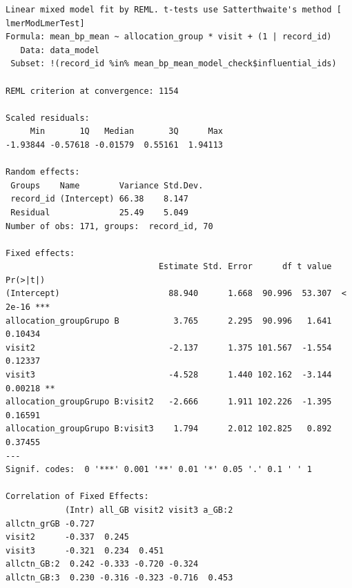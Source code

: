 \documentclass[
  letterpaper,
  DIV=11,
  numbers=noendperiod]{scrartcl}
\newenvironment{Shaded}{\begin{snugshade}}{\end{snugshade}}
\newcommand{\NormalTok}[1]{\textcolor[rgb]{0.00,0.23,0.31}{#1}}
\newcommand{\SpecialCharTok}[1]{\textcolor[rgb]{0.37,0.37,0.37}{#1}}
\begin{document}
\begin{verbatim}
Linear mixed model fit by REML. t-tests use Satterthwaite's method [
lmerModLmerTest]
Formula: mean_bp_mean ~ allocation_group * visit + (1 | record_id)
   Data: data_model
 Subset: !(record_id %in% mean_bp_mean_model_check$influential_ids)

REML criterion at convergence: 1154

Scaled residuals: 
     Min       1Q   Median       3Q      Max 
-1.93844 -0.57618 -0.01579  0.55161  1.94113 

Random effects:
 Groups    Name        Variance Std.Dev.
 record_id (Intercept) 66.38    8.147   
 Residual              25.49    5.049   
Number of obs: 171, groups:  record_id, 70

Fixed effects:
                               Estimate Std. Error      df t value Pr(>|t|)    
(Intercept)                      88.940      1.668  90.996  53.307  < 2e-16 ***
allocation_groupGrupo B           3.765      2.295  90.996   1.641  0.10434    
visit2                           -2.137      1.375 101.567  -1.554  0.12337    
visit3                           -4.528      1.440 102.162  -3.144  0.00218 ** 
allocation_groupGrupo B:visit2   -2.666      1.911 102.226  -1.395  0.16591    
allocation_groupGrupo B:visit3    1.794      2.012 102.825   0.892  0.37455    
---
Signif. codes:  0 '***' 0.001 '**' 0.01 '*' 0.05 '.' 0.1 ' ' 1

Correlation of Fixed Effects:
            (Intr) all_GB visit2 visit3 a_GB:2
allctn_grGB -0.727                            
visit2      -0.337  0.245                     
visit3      -0.321  0.234  0.451              
allctn_GB:2  0.242 -0.333 -0.720 -0.324       
allctn_GB:3  0.230 -0.316 -0.323 -0.716  0.453
\end{verbatim}

\begin{Shaded}
\end{Shaded}
\end{document}
